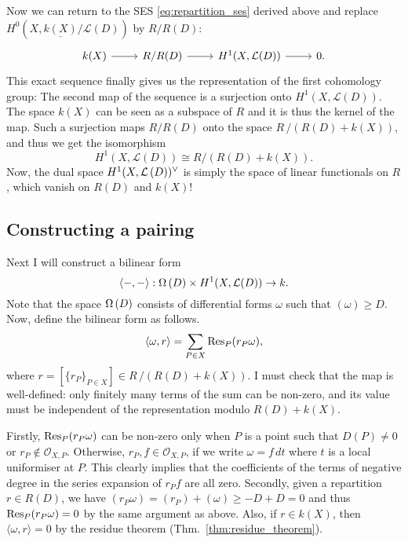 Now we can return to the SES \eqref{eq:repartition_ses} derived above and
replace $H^{0}(X,\underline{k(X)}/\mathcal{L}(D))$ by $R/R(D)$:
\[
  \begin{tikzcd}
    k(X)\rar & R/R(D)\rar & H^{1}(X,\mathcal{L}(D))\rar & 0.
  \end{tikzcd}
\]
This exact sequence finally gives us the representation of the first
cohomology group: The second map of the sequence is a surjection
onto $H^{1}(X,\mathcal{L}(D))$. The space $k(X)$ can be seen as a subspace
of $R$ and it is thus the kernel of the map. Such a surjection maps $R/R(D)$
onto the space $R\,/\left(R(D)+k(X)\right)$, and thus we get the isomorphism
\[H^{1}(X,\mathcal{L}(D))\cong R/\left(R(D)+k(X)\right).\]
Now, the dual space $H^1(X,\mathcal{L}\left(D\right))^{\vee}$ is simply the space
of linear functionals on $R$, which vanish on $R(D)$ and $k(X)$!

\subsection{Constructing a pairing}
Next I will construct a bilinear form
\[
  \langle -,-\rangle:\Omega\left(D\right)\times H^{1}(X,\mathcal{L}(D))\to k.
\]
Note that the space $\Omega\left(D\right)$ consists of differential forms $\omega$
such that $(\omega)\geq D$.
Now, define the bilinear form as follows.
\[
  \langle\omega,r\rangle=\sum_{P\in X}\operatorname{Res}_{P}(r_{P}\omega),
\]
where $r=[\{r_{P}\}_{P\in X}]\in R\,/\left(R(D)+k(X)\right)$. I must check
that the map is well-defined: only finitely many terms of the sum can be
non-zero, and its value must be independent of the representation modulo
$R(D)+k(X)$.

Firstly, $\operatorname{Res}_{P}(r_{P}\omega)$ can be non-zero only when $P$ is a point
such that $D(P)\neq 0$ or $r_{P}\not\in\mathscr{O}_{X,P}$. Otherwise,
$r_{P},f\in\mathscr{O}_{X,P}$, if we write $\omega=f\,dt$ where $t$ is a
local uniformiser at $P$. This clearly implies that the coefficients of the
terms of negative degree in the series expansion of $r_{P}f$ are all zero.
Secondly, given a repartition $r\in R(D)$, we have $(r_{P}\omega)
=(r_{P})+(\omega) \geq -D+D=0$ and thus $\operatorname{Res}_{P}(r_{P}\omega)=0$ by the same
argument as above. Also, if $r\in k(X)$, then $\langle \omega,r\rangle=0$ by
the residue theorem (Thm.~\ref{thm:residue_theorem}).


